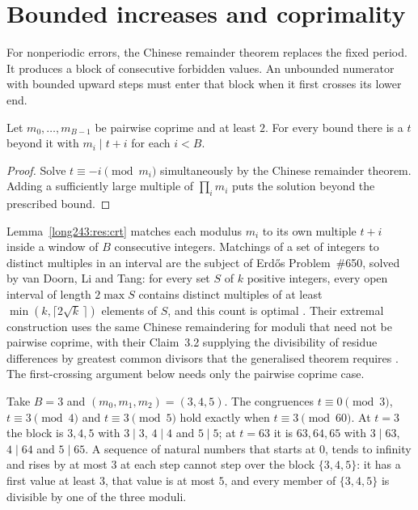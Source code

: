 \section{Bounded increases and coprimality}\label{long243:sec:barrier}

For nonperiodic errors, the Chinese remainder theorem replaces the
fixed period. It produces a block of consecutive forbidden values.
An unbounded numerator with bounded upward steps must enter that
block when it first crosses its lower end.

\begin{lemma}\label{long243:res:crt}
Let $m_0,\ldots,m_{B-1}$ be pairwise coprime and at least $2$.  For every bound
there is a $t$ beyond it with $m_i\mid t+i$ for each $i<B$.
\end{lemma}

\begin{proof}
Solve $t\equiv-i\pmod{m_i}$ simultaneously by the Chinese
remainder theorem. Adding a sufficiently large multiple of
$\prod_i m_i$ puts the solution beyond the prescribed bound.
\end{proof}



\noindent Lemma~\ref{long243:res:crt} matches each modulus $m_i$ to its own
multiple $t+i$ inside a window of $B$ consecutive integers. Matchings of a set
of integers to distinct multiples in an interval are the subject of
Erd\H{o}s Problem~\#650, solved by van Doorn, Li and Tang: for every set $S$
of $k$ positive integers, every open interval of length $2\max S$ contains
distinct multiples of at least $\min(k,\lceil 2\sqrt{k}\,\rceil)$ elements of
$S$, and this count is optimal \cite[Theorem~2.1]{vandoornlitang2026}. Their
extremal construction uses the same Chinese remaindering for moduli that need
not be pairwise coprime, with their Claim~3.2 supplying the divisibility of
residue differences by greatest common divisors that the generalised theorem
requires \cite[pp.~4--5]{vandoornlitang2026}. The first-crossing argument
below needs only the pairwise coprime case.

\begin{example}\label{long243:ex:crt}
Take $B=3$ and $(m_0,m_1,m_2)=(3,4,5)$.  The congruences $t\equiv0\pmod3$,
$t\equiv3\pmod4$ and $t\equiv3\pmod5$ hold exactly when $t\equiv3\pmod{60}$.
At $t=3$ the block is $3,4,5$ with $3\mid3$, $4\mid4$ and $5\mid5$; at $t=63$
it is $63,64,65$ with $3\mid63$, $4\mid64$ and $5\mid65$.  A sequence of
natural numbers that starts at $0$, tends to infinity and rises by at most $3$
at each step cannot step over the block $\{3,4,5\}$: it has a first value at
least $3$, that value is at most $5$, and every member of $\{3,4,5\}$ is
divisible by one of the three moduli.
\end{example}

